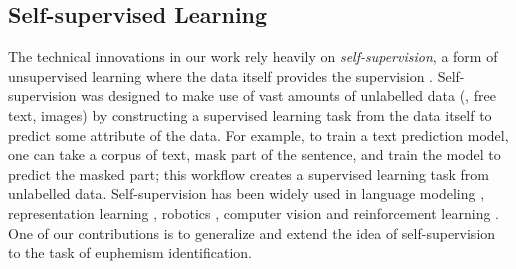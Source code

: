 \subsection{Self-supervised Learning}
The technical innovations in our 
work rely heavily on  \emph{self-supervision}, a form of unsupervised learning where the data itself provides the supervision \cite{weng2019selfsup}. 
Self-supervision was designed to make use of vast amounts of unlabelled data (\eg, free text, images) 
by constructing a supervised learning task from the data itself to predict some attribute of the data.
For example, to train a text prediction model, one can take a corpus of text, mask part of the sentence, and train the model to predict the masked part;
this workflow creates a supervised learning task from unlabelled data.
Self-supervision has been widely used in language modeling \cite{devlin2019bert,lan2019albert,liu2019roberta,baevski2020wav2vec,chen2020big,liu2018empower}, representation learning \cite{feng2019self,kolesnikov2019revisiting,sabokrou2019self}, robotics \cite{mees2019self,nair2017combining,berscheid2020self}, computer vision \cite{zhai2019s4l,sun2019unsupervised,xu2019self,yin2020dreaming} and reinforcement learning \cite{kahn2018self,zeng2018learning,pong2019skew}. 
One of our contributions is to generalize and extend the idea of self-supervision to the task of euphemism identification. 




